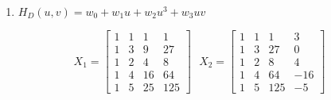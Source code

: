 \documentclass[twoside,12pt]{article}
\begin{document}
\begin{probset}
\begin{prob}
\begin{enumerate}
    \item $H_D(u, v) = w_0 + w_1 u + w_2 u^3 + w_3 u v$
\end{enumerate}
$$
    X_1 = \begin{bmatrix}
    1 &  1 & 1 & 1 \\
    1 &  3 & 9 & 27 \\
    1 &  2 & 4 & 8 \\
    1 &  4 & 16 & 64 \\
    1 &  5 & 25 & 125
    \end{bmatrix} \ \ \ 
    X_2 = \begin{bmatrix}
    1 & 1 & 1   & 3 \\
    1 & 3 & 27  & 0 \\
    1 & 2 & 8   & 4 \\
    1 & 4 & 64  & -16 \\
    1 & 5 & 125 & -5
    \end{bmatrix} 
$$
\end{prob}
\end{probset}
\end{document}
